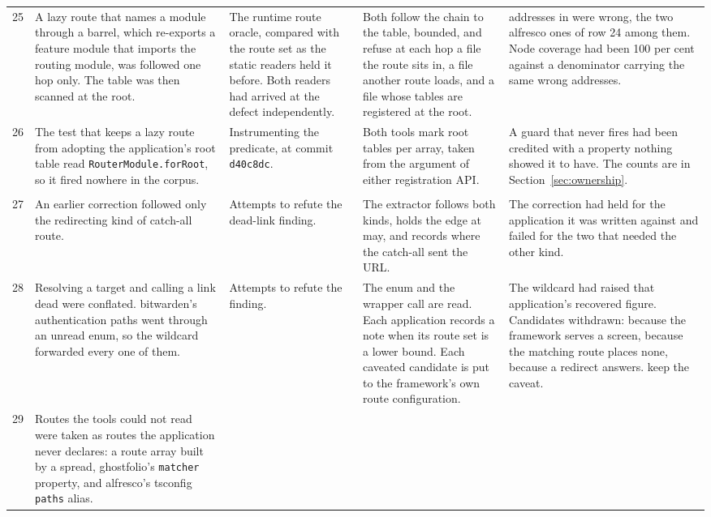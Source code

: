 \begin{xltabular}{\textwidth}{@{}rYYYY@{}}
25 & A lazy route that names a module through a barrel, which re-exports a feature module that imports the routing module, was followed one hop only. The table was then scanned at the root.
  & The runtime route oracle, compared with the route set as the static readers held it before. Both readers had arrived at the defect independently.
  & Both follow the chain to the table, bounded, and refuse at each hop a file the route sits in, a file another route loads, and a file whose tables are registered at the root.
  & \ProbeBeforeNotMounted{} addresses in \ProbeBeforeWhere{} were wrong, the two alfresco ones of row 24 among them. Node coverage had been 100 per cent against a denominator carrying the same wrong addresses. \\
26 & The test that keeps a lazy route from adopting the application's root table read \texttt{RouterModule.\allowbreak forRoot}, so it fired nowhere in the corpus.
  & Instrumenting the predicate, at commit \texttt{d40c8dc}.
  & Both tools mark root tables per array, taken from the argument of either registration API.
  & A guard that never fires had been credited with a property nothing showed it to have. The counts are in Section~\ref{sec:ownership}. \\
\addlinespace
{} \\
27 & An earlier correction followed only the redirecting kind of catch-all route.
  & Attempts to refute the dead-link finding.
  & The extractor follows both kinds, holds the edge at may, and records where the catch-all sent the URL.
  & The correction had held for the application it was written against and failed for the two that needed the other kind. \\
28 & Resolving a target and calling a link dead were conflated. bitwarden's authentication paths went through an unread enum, so the wildcard forwarded every one of them.
  & Attempts to refute the finding.
  & The enum and the wrapper call are read. Each application records a note when its route set is a lower bound. Each caveated candidate is put to the framework's own route configuration.
  & The wildcard had raised that application's recovered figure. Candidates withdrawn: \RoundTwoFrameworkMountsIt{} because the framework serves a screen, \RoundTwoFrameworkPrefix{} because the matching route places none, \RoundTwoFrameworkRedirects{} because a redirect answers. \RoundTwoWildcardCaveated{} keep the caveat. \\
29 & Routes the tools could not read were taken as routes the application never declares: a route array built by a spread, ghostfolio's \texttt{matcher} property, and alfresco's tsconfig \texttt{paths} alias.

\end{xltabular}
